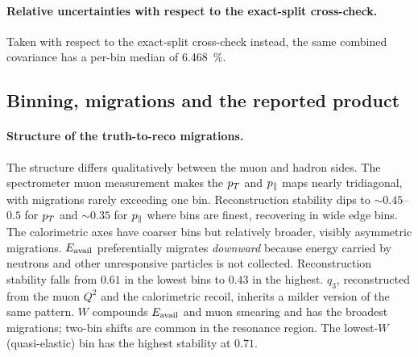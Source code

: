 \paragraph{Relative uncertainties with respect to the exact-split cross-check.} Taken with respect to the exact-split cross-check instead, the same combined covariance has a per-bin median of \SI{6.468}{\percent}. 

\subsection{Binning, migrations and the reported product}\label{recsec:method-binning}

\paragraph{Structure of the truth-to-reco migrations.} The structure differs qualitatively between the muon and hadron sides. The spectrometer muon measurement makes the $p_{T}$ and $p_{\parallel}$ maps nearly tridiagonal, with migrations rarely exceeding one bin. Reconstruction stability dips to ${\sim}0.45$--$0.5$ for $p_{T}$ and ${\sim}0.35$ for $p_{\parallel}$ where bins are finest, recovering in wide edge bins. The calorimetric axes have coarser bins but relatively broader, visibly asymmetric migrations. $E_{\mathrm{avail}}$ preferentially migrates \emph{downward} because energy carried by neutrons and other unresponsive particles is not collected. Reconstruction stability falls from $0.61$ in the lowest bins to $0.43$ in the highest. $q_{3}$, reconstructed from the muon $Q^{2}$ and the calorimetric recoil, inherits a milder version of the same pattern. $W$ compounds $E_{\mathrm{avail}}$ and muon smearing and has the broadest migrations; two-bin shifts are common in the resonance region. The lowest-$W$ (quasi-elastic) bin has the highest stability at $0.71$.

